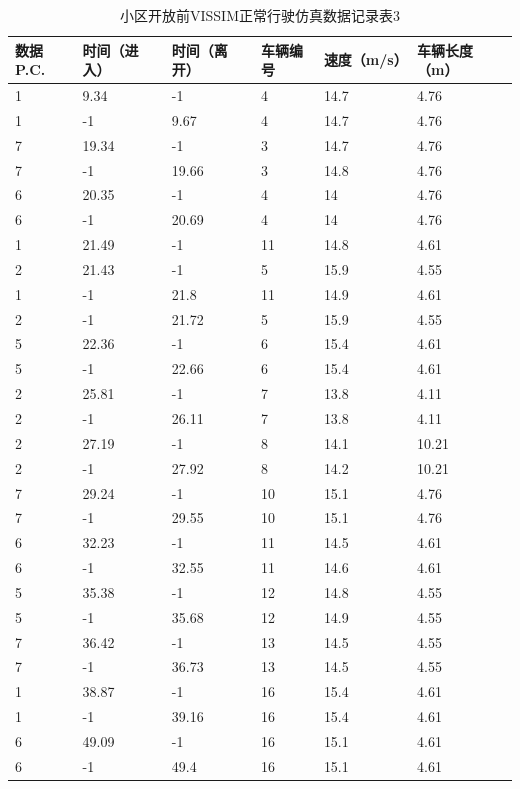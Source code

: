 \begin{table}[h!]
  \centering
  \small
  \caption{小区开放前VISSIM正常行驶仿真数据记录表3}
\begin{tabular*}{\linewidth}{p{45pt}<{\centering}p{65pt}<{\centering}
p{65pt}<{\centering}p{45pt}<{\centering}p{55pt}<{\centering}p{75pt}<{\centering}}
\toprule
 数据P.C. & 时间（进入） & 时间（离开） & 车辆编号& 速度（m/s） & 车辆长度（m） \\
\midrule
1 & 9.34 & -1 & 4 & 14.7 & 4.76 \\
1 & -1 & 9.67 & 4 & 14.7 & 4.76 \\
7 & 19.34 & -1 & 3 & 14.7 & 4.76 \\
7 & -1 & 19.66 & 3 & 14.8 & 4.76 \\
6 & 20.35 & -1 & 4 & 14 & 4.76 \\
6 & -1 & 20.69 & 4 & 14 & 4.76 \\
1 & 21.49 & -1 & 11 & 14.8 & 4.61 \\
2 & 21.43 & -1 & 5 & 15.9 & 4.55 \\
1 & -1 & 21.8 & 11 & 14.9 & 4.61 \\
2 & -1 & 21.72 & 5 & 15.9 & 4.55 \\
5 & 22.36 & -1 & 6 & 15.4 & 4.61 \\
5 & -1 & 22.66 & 6 & 15.4 & 4.61 \\
2 & 25.81 & -1 & 7 & 13.8 & 4.11 \\
2 & -1 & 26.11 & 7 & 13.8 & 4.11 \\
2 & 27.19 & -1 & 8 & 14.1 & 10.21 \\
2 & -1 & 27.92 & 8 & 14.2 & 10.21 \\
7 & 29.24 & -1 & 10 & 15.1 & 4.76 \\
7 & -1 & 29.55 & 10 & 15.1 & 4.76 \\
6 & 32.23 & -1 & 11 & 14.5 & 4.61 \\
6 & -1 & 32.55 & 11 & 14.6 & 4.61 \\
5 & 35.38 & -1 & 12 & 14.8 & 4.55 \\
5 & -1 & 35.68 & 12 & 14.9 & 4.55 \\
7 & 36.42 & -1 & 13 & 14.5 & 4.55 \\
7 & -1 & 36.73 & 13 & 14.5 & 4.55 \\
1 & 38.87 & -1 & 16 & 15.4 & 4.61 \\
1 & -1 & 39.16 & 16 & 15.4 & 4.61 \\
6 & 49.09 & -1 & 16 & 15.1 & 4.61 \\
6 & -1 & 49.4 & 16 & 15.1 & 4.61 \\

\end{tabular*}
\end{table}
